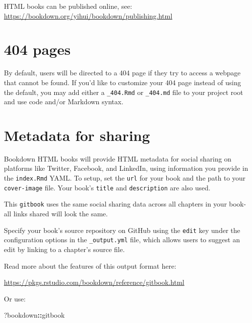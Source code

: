 \documentclass[
]{book}
\newenvironment{Shaded}{\begin{snugshade}}{\end{snugshade}}
\newcommand{\NormalTok}[1]{#1}
\newcommand{\SpecialCharTok}[1]{\textcolor[rgb]{0.81,0.36,0.00}{\textbf{#1}}}
\theoremstyle{definition}
\theoremstyle{definition}
\theoremstyle{definition}
\theoremstyle{definition}
\theoremstyle{remark}
\begin{document}
HTML books can be published online, see: \url{https://bookdown.org/yihui/bookdown/publishing.html}

\section{404 pages}\label{pages}

By default, users will be directed to a 404 page if they try to access a webpage that cannot be found. If you'd like to customize your 404 page instead of using the default, you may add either a \texttt{\_404.Rmd} or \texttt{\_404.md} file to your project root and use code and/or Markdown syntax.

\section{Metadata for sharing}\label{metadata-for-sharing}

Bookdown HTML books will provide HTML metadata for social sharing on platforms like Twitter, Facebook, and LinkedIn, using information you provide in the \texttt{index.Rmd} YAML. To setup, set the \texttt{url} for your book and the path to your \texttt{cover-image} file. Your book's \texttt{title} and \texttt{description} are also used.

This \texttt{gitbook} uses the same social sharing data across all chapters in your book- all links shared will look the same.

Specify your book's source repository on GitHub using the \texttt{edit} key under the configuration options in the \texttt{\_output.yml} file, which allows users to suggest an edit by linking to a chapter's source file.

Read more about the features of this output format here:

\url{https://pkgs.rstudio.com/bookdown/reference/gitbook.html}

Or use:

\begin{Shaded}
\begin{Highlighting}[]
\NormalTok{?bookdown}\SpecialCharTok{::}\NormalTok{gitbook}
\end{Highlighting}
\end{Shaded}


  
\end{document}
